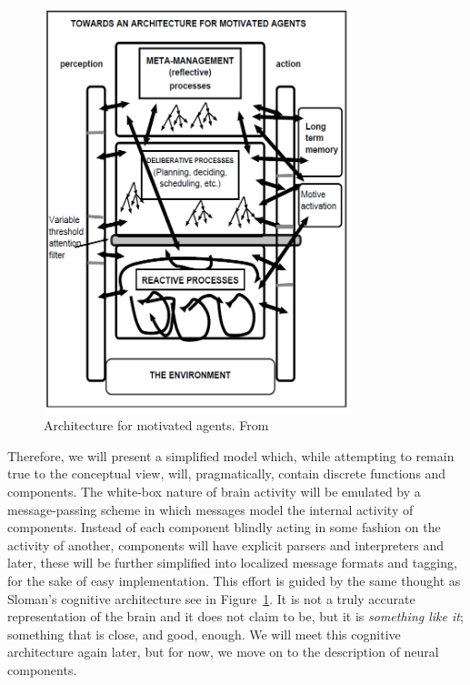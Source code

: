 \begin{figure}
	\centering
	\includegraphics[width=0.8\textwidth]{Figs/slomanSystem.png}
	\caption{Architecture for motivated agents. From \cite[p.\ 10]{sloman1997}}
	\label{fig:slomanSystem}
\end{figure}

Therefore, we will present a simplified model which, while attempting to remain true to the conceptual view, will, pragmatically, contain discrete functions and components. The white-box nature of brain activity will be emulated by a message-passing scheme in which messages model the internal activity of components. Instead of each component blindly acting in some fashion on the activity of another, components will have explicit parsers and interpreters and later, these will be further simplified into localized message formats and tagging, for the sake of easy implementation.
This effort is guided by the same thought as Sloman's cognitive architecture see in Figure~\ref{fig:slomanSystem}. It is not a truly accurate representation of the brain and it does not claim to be, but it is {\em something like it}; something that is close, and good, enough. We will meet this cognitive architecture again later, but for now, we move on to the description of neural components.

